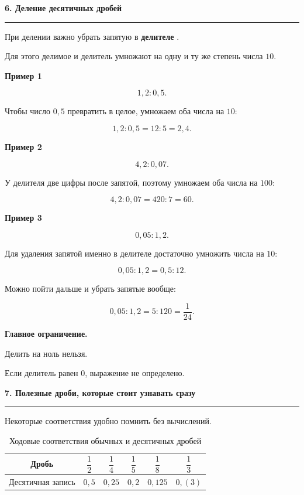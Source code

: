 \documentclass[a4paper,12pt]{article}
\newcommand{\topic}[1]{%
    \par\vspace{0.9em}%
    {\Large\bfseries\color{darkaccent}#1}\par
    \vspace{0.25em}
    \noindent
    \color{accent}\rule{\linewidth}{0.6pt}
    \color{black}
    \vspace{0.55em}
}
\newcommand{\subtopic}[1]{%
    \par\vspace{0.55em}%
    {\large\bfseries\color{textgray}#1}\par
    \vspace{0.2em}
}
\newcommand{\important}[1]{%
    \textbf{\color{darkaccent}#1}%
}
\begin{document}

\topic{6. Деление десятичных дробей}

При делении важно убрать запятую в
\important{делителе}.

Для этого делимое и делитель умножают
на одну и ту же степень числа $10$.

\subtopic{Пример 1}

\[
1{,}2:0{,}5.
\]

Чтобы число $0{,}5$ превратить в целое, умножаем
оба числа на $10$:

\[
1{,}2:0{,}5
=
12:5
=
2{,}4.
\]

\subtopic{Пример 2}

\[
4{,}2:0{,}07.
\]

У делителя две цифры после запятой,
поэтому умножаем оба числа на $100$:

\[
4{,}2:0{,}07
=
420:7
=
60.
\]

\subtopic{Пример 3}

\[
0{,}05:1{,}2.
\]

Для удаления запятой именно в делителе достаточно умножить
числа на $10$:

\[
0{,}05:1{,}2
=
0{,}5:12.
\]

Можно пойти дальше и убрать запятые вообще:

\[
0{,}05:1{,}2
=
5:120
=
\frac{1}{24}.
\]

\important{Главное ограничение.}
Делить на ноль нельзя.

Если делитель равен $0$, выражение не определено.


\topic{7. Полезные дроби, которые стоит узнавать сразу}

Некоторые соответствия удобно помнить без вычислений.

\begin{table}[h]
\centering
\caption{Ходовые соответствия обычных и десятичных дробей}
\renewcommand{\arraystretch}{1.35}

\begin{tabular}{@{}cccccc@{}}
\toprule
Дробь
&
$\dfrac12$
&
$\dfrac14$
&
$\dfrac15$
&
$\dfrac18$
&
$\dfrac13$
\\
\midrule
Десятичная запись
&
$0{,}5$
&
$0{,}25$
&
$0{,}2$
&
$0{,}125$
&
$0{,}(3)$
\\
\bottomrule
\end{tabular}
\end{table}
\end{document}
